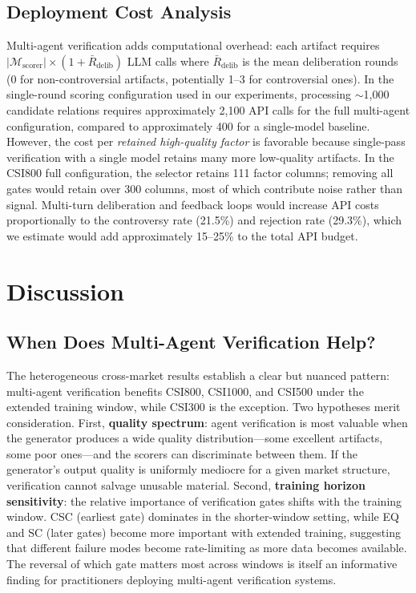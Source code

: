 \documentclass[sigconf]{acmart}
\begin{document}
\subsection{Deployment Cost Analysis}

Multi-agent verification adds computational overhead: each artifact requires $|\mathcal{M}_{\text{scorer}}| \times (1 + \bar{R}_{\text{delib}})$ LLM calls where $\bar{R}_{\text{delib}}$ is the mean deliberation rounds (0 for non-controversial artifacts, potentially 1--3 for controversial ones). In the single-round scoring configuration used in our experiments, processing $\sim$1,000 candidate relations requires approximately 2,100 API calls for the full multi-agent configuration, compared to approximately 400 for a single-model baseline. However, the cost per \textit{retained high-quality factor} is favorable because single-pass verification with a single model retains many more low-quality artifacts. In the CSI800 full configuration, the selector retains 111 factor columns; removing all gates would retain over 300 columns, most of which contribute noise rather than signal. Multi-turn deliberation and feedback loops would increase API costs proportionally to the controversy rate (21.5\%) and rejection rate (29.3\%), which we estimate would add approximately 15--25\% to the total API budget.

\section{Discussion}
\label{sec:discussion}

\subsection{When Does Multi-Agent Verification Help?}

The heterogeneous cross-market results establish a clear but nuanced pattern: multi-agent verification benefits CSI800, CSI1000, and CSI500 under the extended training window, while CSI300 is the exception. Two hypotheses merit consideration. First, \textbf{quality spectrum}: agent verification is most valuable when the generator produces a wide quality distribution---some excellent artifacts, some poor ones---and the scorers can discriminate between them. If the generator's output quality is uniformly mediocre for a given market structure, verification cannot salvage unusable material. Second, \textbf{training horizon sensitivity}: the relative importance of verification gates shifts with the training window. CSC (earliest gate) dominates in the shorter-window setting, while EQ and SC (later gates) become more important with extended training, suggesting that different failure modes become rate-limiting as more data becomes available. The reversal of which gate matters most across windows is itself an informative finding for practitioners deploying multi-agent verification systems.
\end{document}
